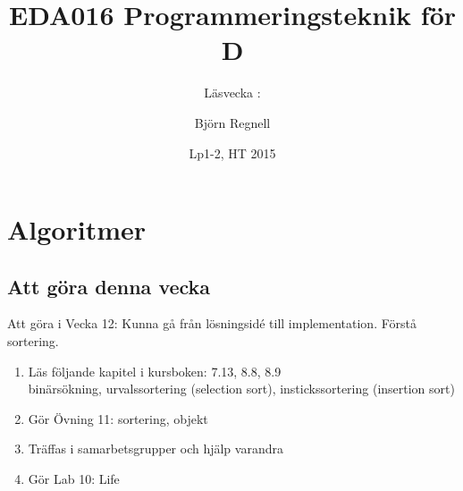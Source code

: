 \documentclass{lecturenotes}
\title[Föreläsningsanteckningar EDA016, 2015]{EDA016 Programmeringsteknik för D}
\subtitle{Läsvecka \vecka: \tema}
\author{Björn Regnell}
\institute{Datavetenskap, LTH}
\date{Lp1-2, HT 2015}
\renewcommand{\vecka}{12}
\newcommand{\tema}{Algoritmer}
\begin{document}
\frame{\titlepage}
\setnextsection{\vecka}
\section[Vecka \vecka: \tema]{\tema}
\frame{\tableofcontents}

\subsection{Att göra denna vecka}
\begin{Slide}{Att göra i Vecka \vecka: Kunna gå från lösningsidé till implementation. Förstå sortering.}

\begin{enumerate}
\item Läs följande kapitel i kursboken: 7.13, 8.8, 8.9  \\  
binärsökning, urvalssortering (selection sort), instickssortering (insertion sort)  
\item Gör Övning 11: sortering, objekt
\item Träffas i samarbetsgrupper och hjälp varandra 
\item Gör Lab 10: Life
\end{enumerate}
\end{Slide}
\end{document}
